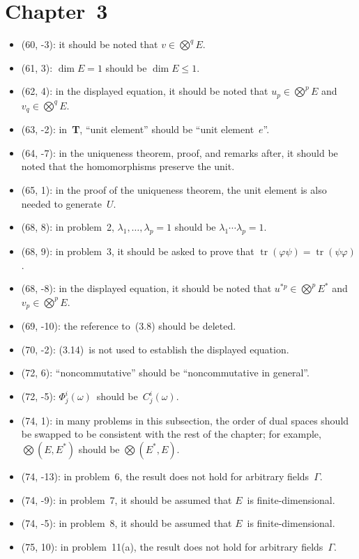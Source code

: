 \documentclass[letterpaper,12pt]{article}
\DeclareMathOperator{\tr}{tr}
\newcommand{\bigtprod}{\bigotimes}
\begin{document}
\section*{Chapter~3}
\begin{itemize}
\item (60, -3): it should be noted that \(v\in\bigtprod^q E\).
\item (61, 3): \(\dim E=1\) should be \(\dim E\le 1\).
\item (62, 4): in the displayed equation, it should be noted that \(u_p\in\bigtprod^p E\) and \(v_q\in\bigtprod^q E\).
\item (63, -2): in~\textbf{T}, ``unit element'' should be ``unit element~\(e\)''.
\item (64, -7): in the uniqueness theorem, proof, and remarks after, it should be noted that the homomorphisms preserve the unit.
\item (65, 1): in the proof of the uniqueness theorem, the unit element is also needed to generate~\(U\).
\item (68, 8): in problem~2, \(\lambda_1,\ldots,\lambda_p=1\) should be \(\lambda_1\cdots\lambda_p=1\).
\item (68, 9): in problem~3, it should be asked to prove that \(\tr(\varphi\psi)=\tr(\psi\varphi)\).
\item (68, -8): in the displayed equation, it should be noted that \(u^{*p}\in\bigtprod^p E^*\) and \(v_p\in\bigtprod^p E\).
\item (69, -10): the reference to~(3.8) should be deleted.
\item (70, -2): (3.14)~is not used to establish the displayed equation.
\item (72, 6): ``noncommutative'' should be ``noncommutative in general''.
\item (72, -5): \(\Phi^i_j(\omega)\)~should be~\(C^i_j(\omega)\).
\item (74, 1): in many problems in this subsection, the order of dual spaces should be swapped to be consistent with the rest of the chapter; for example, \(\bigtprod(E,E^*)\) should be \(\bigtprod(E^*,E)\).
\item (74, -13): in problem~6, the result does not hold for arbitrary fields~\(\Gamma\).
\item (74, -9): in problem~7, it should be assumed that \(E\)~is finite-dimensional.
\item (74, -5): in problem~8, it should be assumed that \(E\)~is finite-dimensional.
\item (75, 10): in problem~11(a), the result does not hold for arbitrary fields~\(\Gamma\).

\end{itemize}
\end{document}
